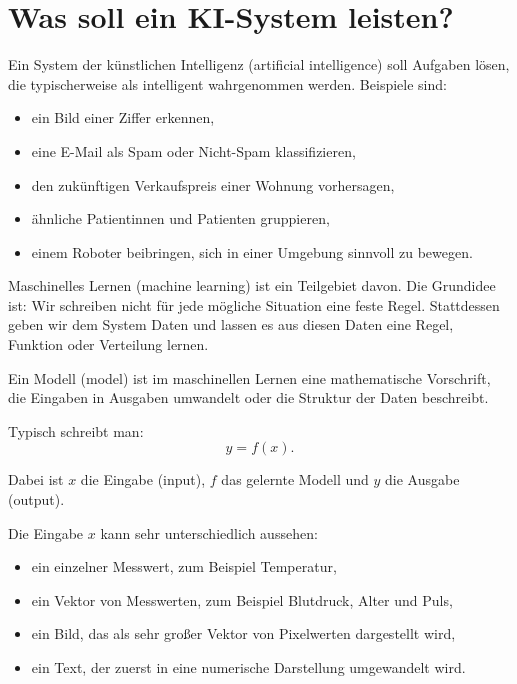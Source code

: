 \section{Was soll ein KI-System leisten?}

Ein System der künstlichen Intelligenz (artificial intelligence) soll Aufgaben lösen, die typischerweise als intelligent wahrgenommen werden.
Beispiele sind:

\begin{itemize}
    \item ein Bild einer Ziffer erkennen,
    \item eine E-Mail als Spam oder Nicht-Spam klassifizieren,
    \item den zukünftigen Verkaufspreis einer Wohnung vorhersagen,
    \item ähnliche Patientinnen und Patienten gruppieren,
    \item einem Roboter beibringen, sich in einer Umgebung sinnvoll zu bewegen.
\end{itemize}

Maschinelles Lernen (machine learning) ist ein Teilgebiet davon.
Die Grundidee ist:
Wir schreiben nicht für jede mögliche Situation eine feste Regel.
Stattdessen geben wir dem System Daten und lassen es aus diesen Daten eine Regel, Funktion oder Verteilung lernen.

\begin{definitionbox}
Ein Modell (model) ist im maschinellen Lernen eine mathematische Vorschrift, die Eingaben in Ausgaben umwandelt oder die Struktur der Daten beschreibt.

Typisch schreibt man:
\[
    y = f(x).
\]

Dabei ist \(x\) die Eingabe (input), \(f\) das gelernte Modell und \(y\) die Ausgabe (output).
\end{definitionbox}

Die Eingabe \(x\) kann sehr unterschiedlich aussehen:

\begin{itemize}
    \item ein einzelner Messwert, zum Beispiel Temperatur,
    \item ein Vektor von Messwerten, zum Beispiel Blutdruck, Alter und Puls,
    \item ein Bild, das als sehr großer Vektor von Pixelwerten dargestellt wird,
    \item ein Text, der zuerst in eine numerische Darstellung umgewandelt wird.
\end{itemize}

